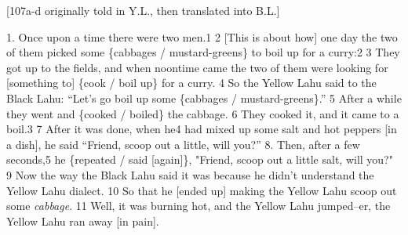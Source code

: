 \setcounter{footnote}{0}


[107a-d originally told in Y.L., then translated into B.L.]

1. Once upon a time there were two men.1 2 [This is about how] one day the two of
them picked some \{cabbages / mustard-greens\} to boil up for a curry:2 3 They
got up to the fields, and when noontime came the two of them were looking for [something
to] \{cook / boil up\} for a curry. 4 So the Yellow Lahu said to the Black Lahu:
``Let's go boil up some \{cabbages / mustard-greens\}.'' 5 After
a while they went and \{cooked / boiled\} the cabbage. 6 They cooked it, and it
came to a boil.3 7 After it was done, when he4 had mixed up some salt and hot peppers
[in a dish], he said ``Friend, scoop out a little, will you?''
8. Then, after a few seconds,5 he \{repeated / said [again]\}, "Friend,
scoop out a little salt, will you?" 9 Now the way the Black Lahu said
it was because he didn't understand the Yellow Lahu dialect. 10 So that he [ended
up] making the Yellow Lahu scoop out some \textit{cabbage}. 11 Well, it was burning
hot, and the Yellow Lahu jumped--er, the Yellow Lahu ran away [in pain].

